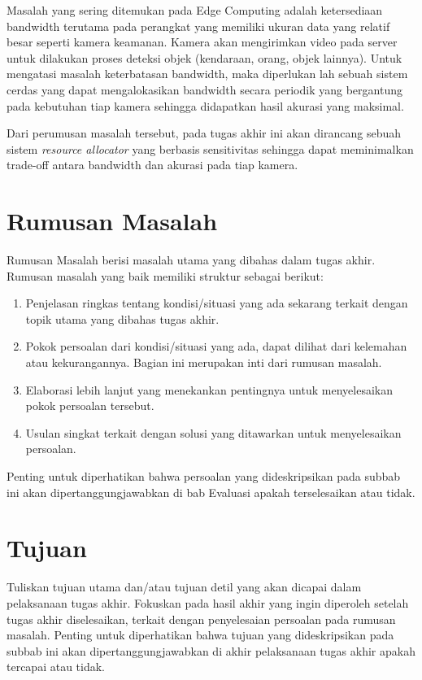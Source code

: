 Masalah yang sering ditemukan pada Edge Computing adalah ketersediaan bandwidth terutama pada perangkat yang memiliki ukuran data yang relatif besar seperti
kamera keamanan. Kamera akan mengirimkan video pada server untuk dilakukan proses deteksi objek (kendaraan, orang, objek lainnya). Untuk mengatasi
masalah keterbatasan bandwidth, maka diperlukan lah sebuah sistem cerdas yang dapat mengalokasikan bandwidth secara periodik yang bergantung pada kebutuhan tiap kamera sehingga
didapatkan hasil akurasi yang maksimal.

Dari perumusan masalah tersebut, pada tugas akhir ini akan dirancang sebuah sistem \textit{resource allocator} yang berbasis
sensitivitas sehingga dapat meminimalkan trade-off antara bandwidth dan akurasi pada tiap kamera.


\section{Rumusan Masalah}

Rumusan Masalah berisi masalah utama yang dibahas dalam tugas akhir. Rumusan masalah yang baik memiliki struktur sebagai berikut:

\begin{enumerate}
    \item Penjelasan ringkas tentang kondisi/situasi yang ada sekarang terkait dengan topik utama yang dibahas tugas akhir.
    \item Pokok persoalan dari kondisi/situasi yang ada, dapat dilihat dari kelemahan atau kekurangannya. Bagian ini merupakan inti dari rumusan masalah.
    \item Elaborasi lebih lanjut yang menekankan pentingnya untuk menyelesaikan pokok persoalan tersebut.
    \item Usulan singkat terkait dengan solusi yang ditawarkan untuk menyelesaikan persoalan.
\end{enumerate}

Penting untuk diperhatikan bahwa persoalan yang dideskripsikan pada subbab ini akan dipertanggungjawabkan di bab Evaluasi apakah terselesaikan atau tidak.

\section{Tujuan}

Tuliskan tujuan utama dan/atau tujuan detil yang akan dicapai dalam pelaksanaan tugas akhir. Fokuskan pada hasil akhir yang ingin diperoleh setelah tugas akhir diselesaikan, terkait dengan penyelesaian persoalan pada rumusan masalah. Penting untuk diperhatikan bahwa tujuan yang dideskripsikan pada subbab ini akan dipertanggungjawabkan di akhir pelaksanaan tugas akhir apakah tercapai atau tidak.

